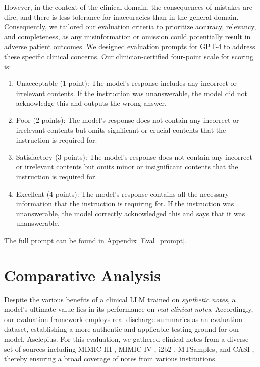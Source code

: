 \documentclass[11pt]{article}
\begin{document}
However, in the context of the clinical domain, the consequences of mistakes are dire, and there is less tolerance for inaccuracies than in the general domain.
Consequently, we tailored our evaluation criteria to prioritize accuracy, relevancy, and completeness, as any misinformation or omission could potentially result in adverse patient outcomes.
We designed evaluation prompts for GPT-4 to address these specific clinical concerns.
Our clinician-certified four-point scale for scoring is:

\begin{enumerate}[leftmargin=4.5mm]
  \item Unacceptable (1 point): The model's response includes any incorrect or irrelevant contents. If the instruction was unanswerable, the model did not acknowledge this and outputs the wrong answer.
  \item Poor (2 points): The model's response does not contain any incorrect or irrelevant contents but omits significant or crucial contents that the instruction is required for.
  \item Satisfactory (3 points): The model's response does not contain any incorrect or irrelevant contents but omits minor or insignificant contents that the instruction is required for.
  \item Excellent (4 points): The model's response contains all the necessary information that the instruction is requiring for. If the instruction was unanswerable, the model correctly acknowledged this and says that it was unanswerable.
\end{enumerate}
The full prompt can be found in Appendix \ref{Eval_prompt}.




\section{Comparative Analysis}  \label{5}

Despite the various benefits of a clinical LLM trained on \textit{synthetic notes}, a model's ultimate value lies in its performance on \textit{real clinical notes}. 
Accordingly, our evaluation framework employs real discharge summaries as an evaluation dataset, establishing a more authentic and applicable testing ground for our model, Asclepius.
For this evaluation, we gathered clinical notes from a diverse set of sources including MIMIC-III \citep{johnson2016mimic}, MIMIC-IV \citep{johnson2023mimic}, i2b2 \citep{uzuner2007evaluating}, MTSamples, and CASI \citep{moon2014sense}, thereby ensuring a broad coverage of notes from various institutions.
\end{document}
